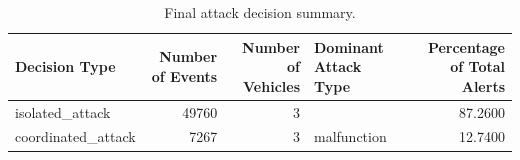 \begin{table}[t]
\centering
\begin{tabular}{lrrlr}
\toprule
Decision Type & Number of Events & Number of Vehicles & Dominant Attack Type & Percentage of Total Alerts \\
\midrule
isolated\_attack & 49760 & 3 &  & 87.2600 \\
coordinated\_attack & 7267 & 3 & malfunction & 12.7400 \\
\bottomrule
\end{tabular}
\caption{Final attack decision summary.}
\label{tab:final-attack-decisions}
\end{table}
